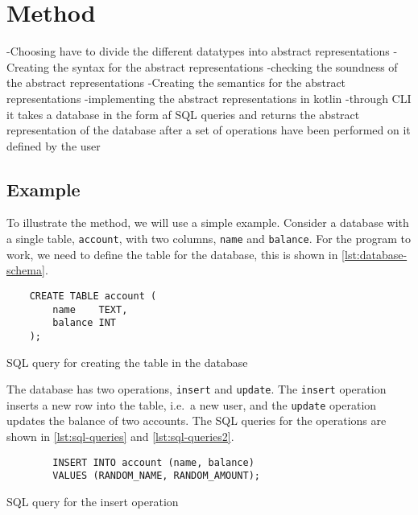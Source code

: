 \section{Method}
\label{sec:method}
-Choosing have to divide the different datatypes into abstract representations
-Creating the syntax for the abstract representations
-checking the soundness of the abstract representations
-Creating the semantics for the abstract representations
-implementing the abstract representations in kotlin
-through CLI it takes a database in the form af SQL queries and returns the abstract representation of the database after a set of operations have been performed on it defined by the user

\subsection{Example}\label{subsec:example}
To illustrate the method, we will use a simple example.
Consider a database with a single table, \texttt{account}, with two columns, \texttt{name} and \texttt{balance}.
For the program to work, we need to define the table for the database, this is shown in \autoref{lst:database-schema}.


\begin{listing}[htb!]
    \begin{verbatim}
    CREATE TABLE account (
        name    TEXT,
        balance INT
    );
    \end{verbatim}
    \caption{SQL query for creating the table in the database}
    \label{lst:database-schema}
\end{listing}


The database has two operations, \texttt{insert} and \texttt{update}.
The \texttt{insert} operation inserts a new row into the table, i.e.\ a new user, and the \texttt{update} operation updates the balance of two accounts.
The SQL queries for the operations are shown in \autoref{lst:sql-queries} and \autoref{lst:sql-queries2}.


\begin{listing}[htb!]
    \begin{verbatim}
        INSERT INTO account (name, balance)
        VALUES (RANDOM_NAME, RANDOM_AMOUNT);
    \end{verbatim}
    \caption{SQL query for the insert operation}
    \label{lst:sql-queries}
\end{listing}


